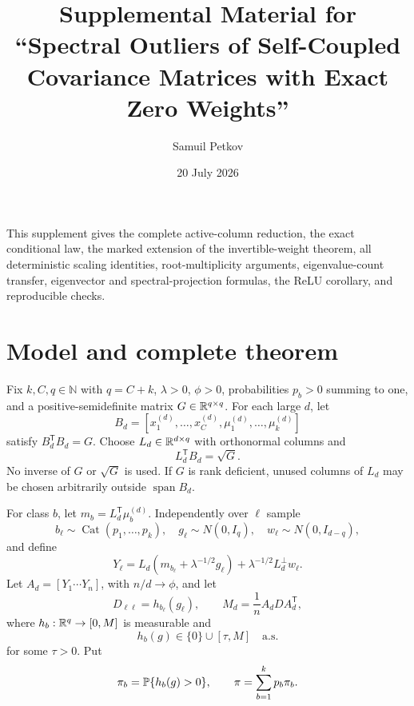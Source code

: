 \documentclass[
  aps,
  prl,
  10pt,
  onecolumn,
  longbibliography,
  nofootinbib
]{revtex4-2}
\theoremstyle{remark}
\begin{document}
\title{Supplemental Material for ``Spectral Outliers of Self-Coupled Covariance Matrices with Exact Zero Weights''}

\author{Samuil Petkov}
\date{20 July 2026}

\maketitle

This supplement gives the complete active-column reduction, the exact conditional law, the marked extension of the invertible-weight theorem, all deterministic scaling identities, root-multiplicity arguments, eigenvalue-count transfer, eigenvector and spectral-projection formulas, the ReLU corollary, and reproducible checks.

\section{Model and complete theorem}

Fix $k,C,q\in\mathbb{N}$ with $q=C+k$, $\lambda>0$, $\phi>0$, probabilities $p_b>0$ summing to one, and a positive-semidefinite matrix $G\in\mathbb{R}^{q\times q}$. For each large $d$, let
\begin{equation}
B_d=[x_1^{(d)},\ldots,x_C^{(d)},\mu_1^{(d)},\ldots,\mu_k^{(d)}]
\end{equation}
satisfy $B_d^{\mathsf T}B_d=G$. Choose $L_d\in\mathbb{R}^{d\times q}$ with orthonormal columns and
\begin{equation}
L_d^{\mathsf T}B_d=\sqrt G .
\end{equation}
No inverse of $G$ or $\sqrt G$ is used. If $G$ is rank deficient, unused columns of $L_d$ may be chosen arbitrarily outside $\operatorname{span}B_d$.

For class $b$, let $m_b=L_d^{\mathsf T}\mu_b^{(d)}$. Independently over $\ell$ sample
\begin{equation}
b_\ell\sim\operatorname{Cat}(p_1,\ldots,p_k),\quad
g_\ell\sim N(0,I_q),\quad
w_\ell\sim N(0,I_{d-q}),
\end{equation}
and define
\begin{equation}
Y_\ell
=L_d\!\left(m_{b_\ell}+\lambda^{-1/2}g_\ell\right)
+\lambda^{-1/2}L_d^\perp w_\ell.
\label{S:Y}
\end{equation}
Let $A_d=[Y_1\cdots Y_n]$, with $n/d\to\phi$, and let
\begin{equation}
D_{\ell\ell}=h_{b_\ell}(g_\ell),\qquad
M_d=\frac1nA_dDA_d^{\mathsf T},
\label{S:M}
\end{equation}
where $h_b:\mathbb{R}^q\to[0,M]$ is measurable and
\begin{equation}
h_b(g)\in\{0\}\cup[\tau,M]\quad\text{a.s.}
\label{S:gap}
\end{equation}
for some $\tau>0$. Put
\begin{equation}
\pi_b=\mathbb{P}\{h_b(g)>0\},\qquad
\pi=\sum_{b=1}^kp_b\pi_b.
\label{S:pi}
\end{equation}
\end{document}
